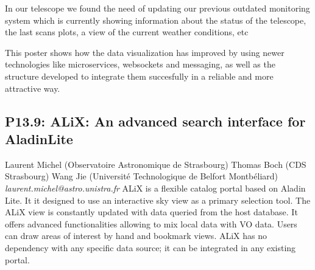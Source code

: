 \documentclass{report}
\begin{document}
In our telescope we found the need of updating our previous outdated monitoring system which is currently showing information about the status of the telescope, the last scans plots, a view of the current weather conditions, etc

This poster shows how the data visualization has improved by using newer technologies like microservices, websockets and messaging, as well as the structure developed to integrate them succesfully in a reliable and more attractive way.\newline
\newpage
\subsection*{P13.9: ALiX: An advanced search interface for AladinLite}
\bigskip
Laurent Michel (Observatoire Astronomique de Strasbourg) \newline Thomas Boch (CDS Strasbourg) \newline  Wang Jie (Université Technologique de Belfort Montbéliard)\newline   \newline  \newline  \newline\newline
{\it laurent.michel@astro.unistra.fr}\newline
\newline\newline
ALiX is a flexible catalog portal based on Aladin Lite. It it designed to use an interactive sky view as a primary selection tool. The ALiX view is constantly updated with data queried from the host database. It offers advanced functionalities allowing to mix local data with VO data. Users can draw areas of interest by hand and bookmark views.  ALiX has no dependency with any specific data source; it can be integrated in any existing portal.\newline
\newpage
\end{document}
